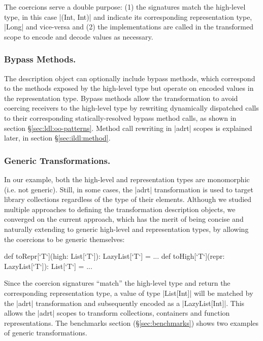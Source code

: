 The coercions serve a double purpose: (1) the signatures match the high-level type, in this case |(Int, Int)| and indicate its corresponding representation type, |Long| and vice-versa and (2) the implementations are called in the transformed scope to encode and decode values as necessary.

\subsubsection{Bypass Methods.} The description object can optionally include bypass methods, which correspond to the methods exposed by the high-level type but operate on encoded values in the representation type. Bypass methods allow the transformation to avoid coercing receivers to the high-level type by rewriting dynamically dispatched calls to their corresponding statically-resolved bypass method calls, as shown in section \S\ref{sec:ldl:oo-patterns}. Method call rewriting in |adrt| scopes is explained later, in section \S\ref{sec:ildl:method}.

\subsubsection{Generic Transformations.} In our example, both the high-level and representation types are monomorphic (i.e. not generic). Still, in some cases, the |adrt| transformation is used to target library collections regardless of the type of their elements. Although we studied multiple approaches to defining the transformation description objects, we converged on the current approach, which has the merit of being concise and naturally extending to generic high-level and representation types, by allowing the coercions to be generic themselves:

\begin{lstlisting-nobreak}
  def toRepr[`T`](high: List[`T`]): LazyList[`T`] = ...
  def toHigh[`T`](repr: LazyList[`T`]): List[`T`] = ...
\end{lstlisting-nobreak}

Since the coercion signatures ``match'' the high-level type and return the corresponding representation type, a value of type |List[Int]| will be matched by the |adrt| transformation and subsequently encoded as a |LazyList[Int]|. This allows the |adrt| scopes to transform collections, containers and function representations. The benchmarks section (\S\ref{sec:benchmarks}) shows two examples of generic transformations.


